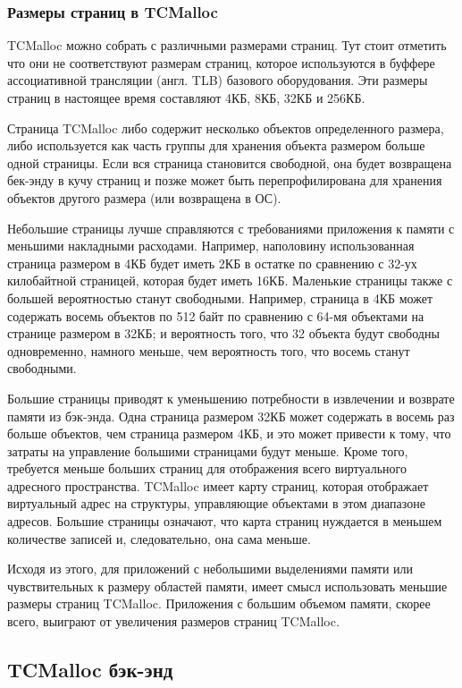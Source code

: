 \subsubsection{Размеры страниц в TCMalloc}

TCMalloc можно собрать с различными размерами страниц. Тут стоит отметить что они не соответствуют размерам страниц, которое используются в буффере ассоциативной трансляции (англ. TLB) базового оборудования. Эти размеры страниц в настоящее время составляют 4КБ, 8КБ, 32КБ и 256КБ.

Страница TCMalloc либо содержит несколько объектов определенного размера, либо используется как часть группы для хранения объекта размером больше одной страницы. Если вся страница становится свободной, она будет возвращена бек-энду в кучу страниц и позже может быть перепрофилирована для хранения объектов другого размера (или возвращена в ОС).

Небольшие страницы лучше справляются с требованиями приложения к памяти с меньшими накладными расходами. Например, наполовину использованная страница размером в 4КБ будет иметь 2КБ в остатке по сравнению с 32-ух килобайтной страницей, которая будет иметь 16КБ. Маленькие страницы также с большей вероятностью станут свободными. Например, страница в 4КБ может содержать восемь объектов по 512 байт по сравнению с 64-мя объектами на странице размером в 32КБ; и вероятность того, что 32 объекта будут свободны одновременно, намного меньше, чем вероятность того, что восемь станут свободными.

Большие страницы приводят к уменьшению потребности в извлечении и возврате памяти из бэк-энда. Одна страница размером 32КБ может содержать в восемь раз больше объектов, чем страница размером 4КБ, и это может привести к тому, что затраты на управление большими страницами будут меньше. Кроме того, требуется меньше больших страниц для отображения всего виртуального адресного пространства. TCMalloc имеет карту страниц, которая отображает виртуальный адрес на структуры, управляющие объектами в этом диапазоне адресов. Большие страницы означают, что карта страниц нуждается в меньшем количестве записей и, следовательно, она сама меньше.

Исходя из этого, для приложений с небольшими выделениями памяти или чувствительных к размеру областей памяти, имеет смысл использовать меньшие размеры страниц TCMalloc. Приложения с большим объемом памяти, скорее всего, выиграют от увеличения размеров страниц TCMalloc.

\subsection{TCMalloc бэк-энд }

